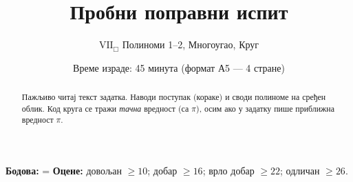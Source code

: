 \documentclass[11pt,a5paper,twoside,addpoints,answers]{exam}
\title{Пробни поправни испит}
\author{$\mathrm{VII}_\Box$ \; Полиноми 1–2, Многоугао, Круг}
\date{Време израде: 45 минута \quad (формат А5 — 4 стране)}
\begin{document}
\maketitle
\thispagestyle{headandfoot}

\ifprintanswers\else
\begin{flushleft}\scriptsize
\gradetable[h]
\end{flushleft}
\begin{abstract}\small
Пажљиво читај текст задатка. Наводи поступак (кораке) и своди полиноме на сређен облик.  
Код круга се тражи \emph{тачна} вредност (са $\pi$), осим ако у задатку пише приближна вредност $\pi$.
\end{abstract}
\fi

\noindent\textbf{Бодова:} \numpoints\;= \quad
\textbf{Оцене:} довољан $\ge 10$;\; добар $\ge 16$;\; врло добар $\ge 22$;\; одличан $\ge 26$.
\end{document}
